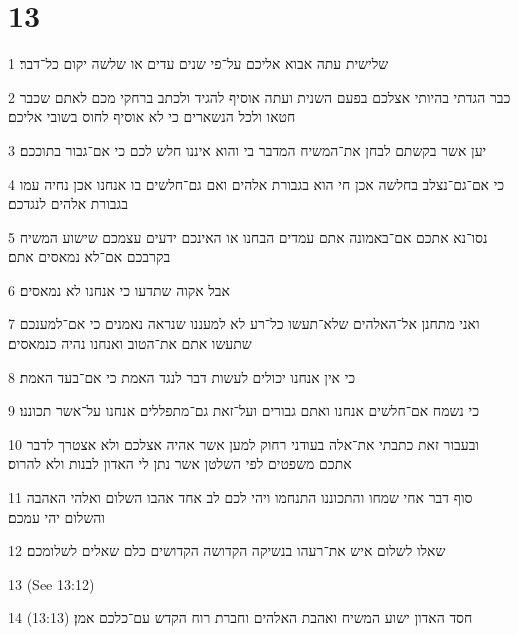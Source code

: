 \chapter{13}

\par 1 שלישית עתה אבוא אליכם על־פי שנים עדים או שלשה יקום כל־דבר׃
\par 2 כבר הגדתי בהיותי אצלכם בפעם השנית ועתה אוסיף להגיד ולכתב ברחקי מכם לאתם שכבר חטאו ולכל הנשארים כי לא אוסיף לחוס בשובי אליכם׃
\par 3 יען אשר בקשתם לבחן את־המשיח המדבר בי והוא איננו חלש לכם כי אם־גבור בתוככם׃
\par 4 כי אם־גם־נצלב בחלשה אכן חי הוא בגבורת אלהים ואם גם־חלשים בו אנחנו אכן נחיה עמו בגבורת אלהים לנגדכם׃
\par 5 נסו־נא אתכם אם־באמונה אתם עמדים הבחנו או האינכם ידעים עצמכם שישוע המשיח בקרבכם אם־לא נמאסים אתם׃
\par 6 אבל אקוה שתדעו כי אנחנו לא נמאסים׃
\par 7 ואני מתחנן אל־האלהים שלא־תעשו כל־רע לא למעננו שנראה נאמנים כי אם־למענכם שתעשו אתם את־הטוב ואנחנו נהיה כנמאסים׃
\par 8 כי אין אנחנו יכולים לעשות דבר לנגד האמת כי אם־בעד האמת׃
\par 9 כי נשמח אם־חלשים אנחנו ואתם גבורים ועל־זאת גם־מתפללים אנחנו על־אשר תכוננו׃
\par 10 ובעבור זאת כתבתי את־אלה בעודני רחוק למען אשר אהיה אצלכם ולא אצטרך לדבר אתכם משפטים לפי השלטן אשר נתן לי האדון לבנות ולא להרוס׃
\par 11 סוף דבר אחי שמחו והתכוננו התנחמו ויהי לכם לב אחד אהבו השלום ואלהי האהבה והשלום יהי עמכם׃
\par 12 שאלו לשלום איש את־רעהו בנשיקה הקדושה הקדושים כלם שאלים לשלומכם׃
\par 13  (See 13:12)
\par 14  (13:13) חסד האדון ישוע המשיח ואהבת האלהים וחברת רוח הקדש עם־כלכם אמן׃


